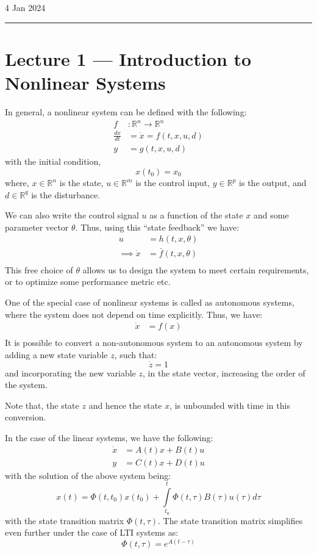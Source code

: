 \hfill\small{4 Jan 2024}
\vspace{0.5em}
\hrule
\vspace{-0.5em}
\section{Lecture 1 --- Introduction to Nonlinear Systems}

In general, a nonlinear system can be defined with the following:
\[
    \begin{aligned}
        f &: \mathbb{R}^n \to \mathbb{R}^n \\
        \frac{dx}{dt} &= \dot{x} = f(t,x,u,d)  \\
        y &= g(t,x,u,d)
    \end{aligned}
\]
with the initial condition,
\[
    x(t_0) = x_0  
\]
where, \( x \in \mathbb{R}^n \) is the state, \( u \in \mathbb{R}^m \) is the control
input, \( y \in \mathbb{R}^p \) is the output, and \( d \in \mathbb{R}^q \) is the 
disturbance.

We can also write the control signal \(u\) as a function of the state \(x\) and some 
parameter vector \(\theta\). Thus, using this ``state feedback'' we have:
\[
    \begin{aligned}
        u &= h(t,x,\theta) \\
        \implies \dot{x} &= \bar{f} (t,x,\theta) \\
    \end{aligned}
\]
This free choice of \(\theta\) allows us to design the system to meet certain requirements, or
to optimize some performance metric etc.

One of the special case of nonlinear systems is called as autonomous systems, where the
system does not depend on time explicitly. Thus, we have:
\[
    \begin{aligned}
        \dot{x} &= f(x) \\
    \end{aligned}
\]
It is possible to convert a non-autonomous system to an autonomous system by adding a
new state variable \(z\), such that:
\[
    \dot{z} = 1   
\]
and incorporating the new variable \(z\), in the state vector, increasing the order of the 
system.
\begin{note}
    Note that, the state \(z\) and hence the state \(x\), is unbounded with time in this 
    conversion.
\end{note}  

In the case of the linear systems, we have the following:
\[
    \begin{aligned}
        \dot{x} & = A(t) x + B(t) u \\
        y &= C(t) x + D(t) u 
    \end{aligned}  
\]
with the solution of the above system being:
\[
    x(t) = \Phi(t,t_0) x(t_0) + \int\limits_{t_0}^{t} \Phi(t,\tau) B(\tau) u(\tau) d\tau
\]
with the state transition matrix \(\Phi(t,\tau)\). The state transition matrix simplifies
even further under the case of LTI systems as:
\[
    \Phi(t,\tau) = e^{A(t-\tau)}  
\]


